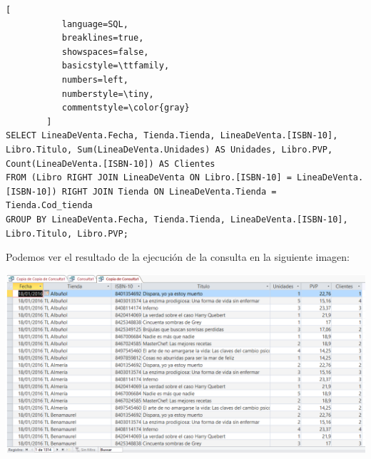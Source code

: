 \documentclass[paper=a4, fontsize=11pt, spanish]{scrartcl}
\numberwithin{equation}{section} %
\numberwithin{figure}{section} %
\numberwithin{table}{section} %
\begin{document}
\begin{lstlisting}[
           language=SQL,
           breaklines=true,
           showspaces=false,
           basicstyle=\ttfamily,
           numbers=left,
           numberstyle=\tiny,
           commentstyle=\color{gray}
        ]
SELECT LineaDeVenta.Fecha, Tienda.Tienda, LineaDeVenta.[ISBN-10], Libro.Titulo, Sum(LineaDeVenta.Unidades) AS Unidades, Libro.PVP, Count(LineaDeVenta.[ISBN-10]) AS Clientes
FROM (Libro RIGHT JOIN LineaDeVenta ON Libro.[ISBN-10] = LineaDeVenta.[ISBN-10]) RIGHT JOIN Tienda ON LineaDeVenta.Tienda = Tienda.Cod_tienda
GROUP BY LineaDeVenta.Fecha, Tienda.Tienda, LineaDeVenta.[ISBN-10], Libro.Titulo, Libro.PVP;
\end{lstlisting}

Podemos ver el resultado de la ejecución de la consulta en la siguiente imagen:\\
\begin{center}
	\includegraphics[scale=0.35]{2-zoom.png}
\end{center}
\end{document}

